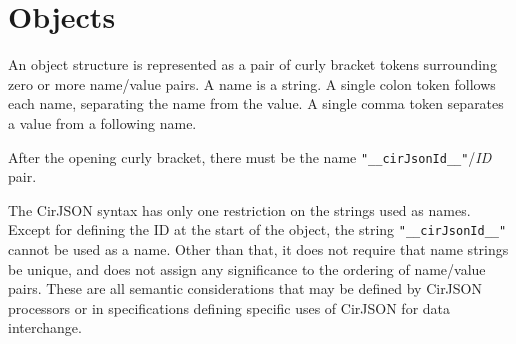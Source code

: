 
\section{Objects}

An object structure is represented as a pair of curly bracket tokens surrounding zero or more name/value pairs.
A name is a string.
A single colon token follows each name, separating the name from the value.
A single comma token separates a value from a following name.

After the opening curly bracket, there must be the name \texttt{"\_{\_}cirJsonId\_\_"}/\textit{ID} pair.

The CirJSON syntax has only one restriction on the strings used as names.
Except for defining the ID at the start of the object, the string \texttt{"\_{\_}cirJsonId\_\_"} cannot be used as a name.
Other than that, it does not require that name strings be unique, and does not assign any significance to the ordering of name/value pairs.
These are all semantic considerations that may be defined by CirJSON processors or in specifications defining specific uses of CirJSON for data interchange.

